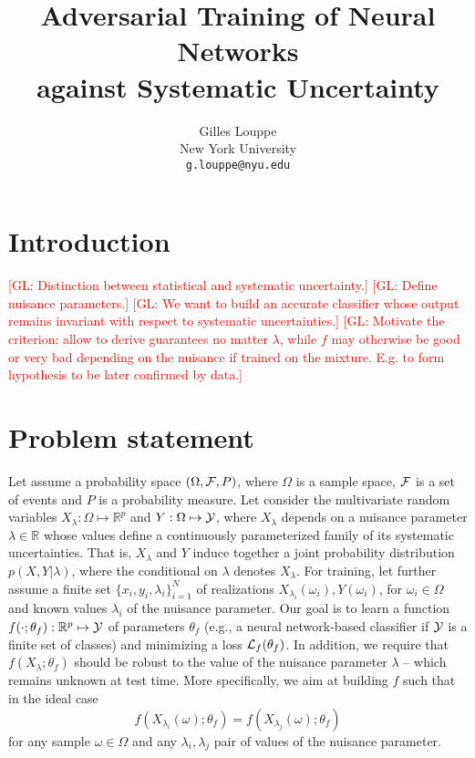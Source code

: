 \documentclass{article}
\title{Adversarial Training of Neural Networks\\
against Systematic Uncertainty}
\author{
  Gilles Louppe \\
  New York University\\
  \texttt{g.louppe@nyu.edu} \\
}
\newcommand{\glnote}[1]{\textcolor{red}{[GL: #1]}}
\theoremstyle{plain}
\begin{document}

\maketitle

\begin{abstract}
\end{abstract}

\section{Introduction}

\glnote{Distinction between statistical and systematic uncertainty.}
\glnote{Define nuisance parameters.}
\glnote{We want to build an accurate classifier whose output remains invariant with
respect to systematic uncertainties.}
\glnote{Motivate the criterion: allow to derive guarantees no matter $\lambda$,
while $f$ may otherwise be good or very bad depending on the nuisance if trained
on the mixture. E.g. to form hypothesis to be later confirmed by data.}



\section{Problem statement}
\label{sec:problem}

Let assume a probability space $(\Omega, {\cal F}, P)$, where $\Omega$ is a
sample space, ${\cal F}$ is a set of events and $P$ is a probability measure.
Let consider the multivariate random variables $X_\lambda: \Omega \mapsto
\mathbb{R}^p$ and $Y: \Omega \mapsto {\cal Y}$, where $X_\lambda$ depends on a
nuisance parameter $\lambda \in \mathbb{R}$ whose values define a continuously
parameterized family of its systematic uncertainties. That is, $X_\lambda$ and
$Y$ induce together a joint probability distribution $p(X,Y|\lambda)$, where the
conditional on $\lambda$ denotes $X_\lambda$. For training, let further assume a
finite set $\{ x_i, y_i, \lambda_i \}_{i=1}^N$ of realizations
$X_{\lambda_i}(\omega_i), Y(\omega_i)$, for $\omega_i \in \Omega$ and known
values $\lambda_i$ of the nuisance parameter. Our goal is to learn a function
$f(\cdot;\theta_f) : \mathbb{R}^p \mapsto {\cal Y}$ of parameters $\theta_f$
(e.g., a neural network-based classifier if ${\cal Y}$ is a finite set of
classes) and minimizing  a loss ${\cal L}_f(\theta_f)$. In addition, we require
that $f(X_\lambda ; \theta_f)$ should be robust to the value of the nuisance parameter $\lambda$ --
which remains unknown at test time. More specifically, we aim at building $f$
such that in the ideal case
\begin{equation}\label{eqn:criterion-true}
f(X_{\lambda_i}(\omega) ; \theta_f) = f(X_{\lambda_j}(\omega) ; \theta_f)
\end{equation} for any
sample $\omega \in \Omega$ and any $\lambda_i, \lambda_j$ pair of values of the
nuisance parameter.
\end{document}
